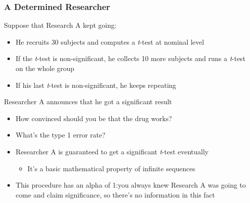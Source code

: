 \documentclass[10pt, block=fill]{beamer}
\begin{document}
\begin{frame}
   \frametitle{A Determined Researcher}
   
   Suppose that Research A kept going:
   \begin{itemize}
       \item He recruits 30 subjects and computes a \textit{t}-test at nominal level
       \item If the \textit{t}-test is non-significant, he collects 10 more subjects and runs a \textit{t}-test on the whole group
       \item If his last \textit{t}-test is non-significant, he keeps repeating 
   \end{itemize}
   
   \begin{exampleblock}{Researcher A announces that he got a significant result}
   \begin{itemize}
       \item How convinced should you be that the drug works?
       \item What's the type 1 error rate?
   \end{itemize}
   \end{exampleblock}

   \begin{itemize}
       \item Researcher A is guaranteed to get a significant \textit{t}-test eventually
       \begin{itemize}
           \item It's a basic mathematical property of infinite sequences
       \end{itemize}
       \item This procedure has an alpha of 1:you always knew Research A was going to come and claim significance, so there's no information in this fact
   \end{itemize}
\end{frame}
\end{document}

